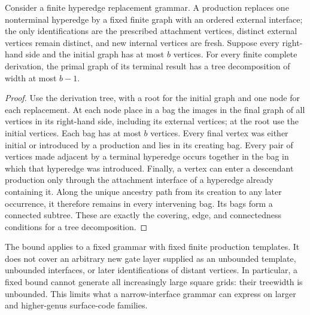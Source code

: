 \begin{proposition}
Consider a finite hyperedge replacement grammar. A production replaces one nonterminal hyperedge by a fixed finite graph with an ordered external interface; the only identifications are the prescribed attachment vertices, distinct external vertices remain distinct, and new internal vertices are fresh. Suppose every right-hand side and the initial graph has at most $b$ vertices. For every finite complete derivation, the primal graph of its terminal result has a tree decomposition of width at most $b-1$.
\end{proposition}
\begin{proof}
Use the derivation tree, with a root for the initial graph and one node for each replacement. At each node place in a bag the images in the final graph of all vertices in its right-hand side, including its external vertices; at the root use the initial vertices. Each bag has at most $b$ vertices. Every final vertex was either initial or introduced by a production and lies in its creating bag. Every pair of vertices made adjacent by a terminal hyperedge occurs together in the bag in which that hyperedge was introduced. Finally, a vertex can enter a descendant production only through the attachment interface of a hyperedge already containing it. Along the unique ancestry path from its creation to any later occurrence, it therefore remains in every intervening bag. Its bags form a connected subtree. These are exactly the covering, edge, and connectedness conditions for a tree decomposition.
\end{proof}

The bound applies to a fixed grammar with fixed finite production templates. It does not cover an arbitrary new gate layer supplied as an unbounded template, unbounded interfaces, or later identifications of distant vertices. In particular, a fixed bound cannot generate all increasingly large square grids: their treewidth is unbounded. This limits what a narrow-interface grammar can express on larger and higher-genus surface-code families.

